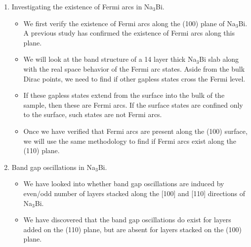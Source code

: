\documentclass[english]{revtex4-1}
\begin{document}
\begin{enumerate}

    \item Investigating the existence of Fermi arcs in Na$_3$Bi. 

         \begin{itemize}
             \item We first verify the existence of Fermi arcs along the (100) plane of Na$_3$Bi. A previous study has confirmed the existence of Fermi arcs along this plane.\cite{xu_observation_2015}
             
             \item We will look at the band structure of a 14 layer thick Na$_3$Bi slab along with the real space behavior of the Fermi arc states. Aside from the bulk Dirac points, we need to find if other gapless states cross the Fermi level.  
             
             \item If these gapless states extend from the surface into the bulk of the sample, then these are Fermi arcs.  If the surface states are confined only to the surface, such states are not Fermi arcs.     
             
             \item Once we have verified that Fermi arcs are present along the (100) surface, we will use the same methodology to find if Fermi arcs exist along the (110) plane.
             
         \end{itemize}

    \item Band gap oscillations in Na$_3$Bi.
    
        \begin{itemize}
            
            \item We have looked into whether band gap oscillations are induced by even/odd number of layers stacked along the [100] and [110] directions of Na$_3$Bi.
            
            \item We have discovered that the band gap oscillations do exist for layers added on the (110) plane, but are absent for layers stacked on the (100) plane.
            
        \end{itemize}
    

\end{enumerate}
\end{document}
